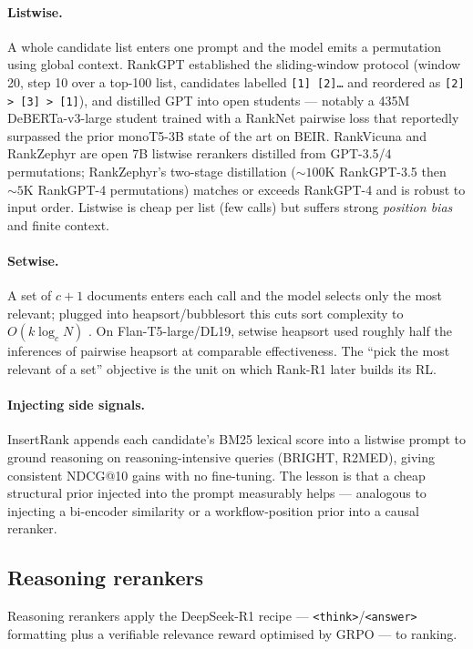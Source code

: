 \paragraph{Listwise.} A whole candidate list enters one prompt and the model
emits a permutation using global context. RankGPT \citep{rl:sun2023rankgpt}
established the sliding-window protocol (window 20, step 10 over a top-100 list,
candidates labelled \texttt{[1] [2]\ldots} and reordered as \texttt{[2] > [3] >
[1]}), and distilled GPT into open students --- notably a 435M DeBERTa-v3-large
student trained with a RankNet pairwise loss that reportedly surpassed the prior
monoT5-3B state of the art on BEIR. RankVicuna \citep{rl:pradeep2023rankvicuna}
and RankZephyr \citep{rl:pradeep2023rankzephyr} are open 7B listwise rerankers
distilled from GPT-3.5/4 permutations; RankZephyr's two-stage distillation
(${\sim}100$K RankGPT-3.5 then ${\sim}5$K RankGPT-4 permutations) matches or
exceeds RankGPT-4 and is robust to input order. Listwise is cheap per list (few
calls) but suffers strong \emph{position bias} and finite context.

\paragraph{Setwise.} A set of $c{+}1$ documents enters each call and the model
selects only the most relevant; plugged into heapsort/bubblesort this cuts sort
complexity to $O(k\log_c N)$ \citep{rl:zhuang2024setwise}. On Flan-T5-large/DL19,
setwise heapsort used roughly half the inferences of pairwise heapsort at
comparable effectiveness. The ``pick the most relevant of a set'' objective is
the unit on which Rank-R1 later builds its RL.

\paragraph{Injecting side signals.} InsertRank
\citep{rl:chordia2025insertrank} appends each candidate's BM25 lexical score
into a listwise prompt to ground reasoning on reasoning-intensive queries (BRIGHT,
R2MED), giving consistent NDCG@10 gains with no fine-tuning. The lesson is that a
cheap structural prior injected into the prompt measurably helps --- analogous to
injecting a bi-encoder similarity or a workflow-position prior into a causal
reranker.

\subsection{Reasoning rerankers}
\label{sec:reasoning-rerankers}
Reasoning rerankers apply the DeepSeek-R1 recipe \citep{rl:deepseekr1} ---
\texttt{<think>}/\texttt{<answer>} formatting plus a verifiable relevance reward
optimised by GRPO --- to ranking.

